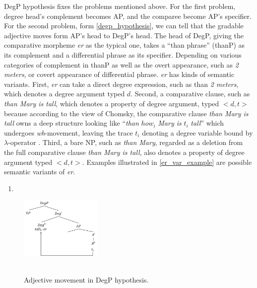 \documentclass{ctexart}
\let \cite \parencite
\begin{document}
DegP hypothesis fixes the problems mentioned above. For the first problem, degree head's complement becomes AP, and the comparee become AP's specifier. For the second problem, form \ref{degp_hypothesis}, we can tell that the gradable adjective moves form AP's head to DegP's head. The head of DegP, giving the comparative morpheme \textit{er} as the typical one, takes a ``than phrase'' (thanP) as its complement and a differential phrase as its specifier. Depending on various categories of complement in thanP as well as the overt appearance, such as \textit{2 meters}, or covert appearance of differential phrase. \textit{er} has kinds of semantic variants. First, \textit{er} can take a direct degree expression, such as than \textit{2 meters}, which denotes a degree argument typed $d$. Second, a comparative clause, such as \textit{than Mary is tall}, which denotes a property of degree argument, typed $<d,t>$ because according to the view of Chomsky, the comparative clause \textit{than Mary is tall} owns a deep structure looking like ``\textit{than} $how_i$ \textit{Mary is} $t_i$ \textit{tall}'' which undergoes \textit{wh}-movement, leaving the trace $t_i$ denoting a degree variable bound by $\lambda$-operator \cite{chomsky1977}. Third, a bare NP, such as \textit{than Mary}, regarded as a deletion from the full comparative clause \textit{than Mary is tall}, also denotes a property of degree argument typed $<d,t>$. Examples illustrated in \ref{er_var_example} are possible semantic variants of \textit{er}.

\begin{enumerate}
    \item \label{degp_hypothesis}
\end{enumerate}

\begin{figure}[H]
    \centering
    \includegraphics[width=0.35\textwidth]{pic/degP_hy.png}
    \begin{caption}
        \\ \vspace{-1.1ex}
        Adjective movement in DegP hypothesis.
    \end{caption}
\end{figure}
\end{document}

